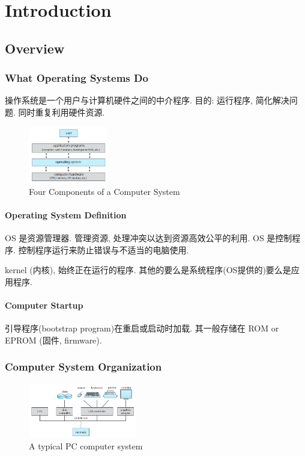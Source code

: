 \newpage
\section{Introduction}

\subsection{Overview}

\subsubsection{What Operating Systems Do}
操作系统是一个用户与计算机硬件之间的中介程序. 目的: 运行程序, 简化解决问题. 同时重复利用硬件资源. 

\begin{figure}[!htb]
    \centering
    \includegraphics[width=0.309\textwidth]{pic/OS1/Four Components of a Computer System}
    \caption{Four Components of a Computer System}
\end{figure}

\paragraph{Operating System Definition} OS 是资源管理器. 管理资源, 处理冲突以达到资源高效公平的利用. OS 是控制程序. 控制程序运行来防止错误与不适当的电脑使用.

kernel (内核), 始终正在运行的程序. 其他的要么是系统程序(OS提供的)要么是应用程序. 

\paragraph{Computer Startup} 引导程序(bootstrap program)在重启或启动时加载. 其一般存储在 ROM or EPROM (固件, firmware). 

\subsubsection{Computer System Organization}
\begin{figure}[!htb]
    \centering
    \includegraphics[width=0.42\textwidth]{pic/OS1/A typical PC computer system}
    \caption{A typical PC computer system}
\end{figure}


